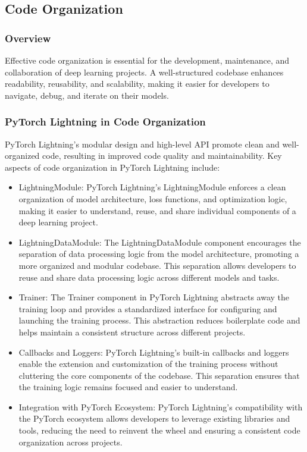 \documentclass[12pt]{article}
\begin{document}
\subsection{Code Organization}

\subsubsection{Overview}

Effective code organization is essential for the development, maintenance, and collaboration of deep learning projects. A well-structured codebase enhances readability, reusability, and scalability, making it easier for developers to navigate, debug, and iterate on their models.

\subsubsection{PyTorch Lightning in Code Organization}

PyTorch Lightning's modular design and high-level API promote clean and well-organized code, resulting in improved code quality and maintainability. Key aspects of code organization in PyTorch Lightning include:

\begin{itemize}
    \item LightningModule: PyTorch Lightning's LightningModule enforces a clean organization of model architecture, loss functions, and optimization logic, making it easier to understand, reuse, and share individual components of a deep learning project.
    \item LightningDataModule: The LightningDataModule component encourages the separation of data processing logic from the model architecture, promoting a more organized and modular codebase. This separation allows developers to reuse and share data processing logic across different models and tasks.
    \item Trainer: The Trainer component in PyTorch Lightning abstracts away the training loop and provides a standardized interface for configuring and launching the training process. This abstraction reduces boilerplate code and helps maintain a consistent structure across different projects.
    \item Callbacks and Loggers: PyTorch Lightning's built-in callbacks and loggers enable the extension and customization of the training process without cluttering the core components of the codebase. This separation ensures that the training logic remains focused and easier to understand.
    \item Integration with PyTorch Ecosystem: PyTorch Lightning's compatibility with the PyTorch ecosystem allows developers to leverage existing libraries and tools, reducing the need to reinvent the wheel and ensuring a consistent code organization across projects.
\end{itemize}
\end{document}
